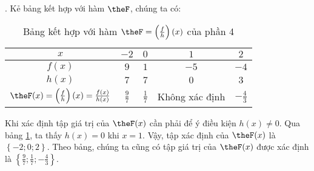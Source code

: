 . Kẻ bảng kết hợp với hàm $\theF$, chúng ta có:

\begin{table}[H]
   \centering
   \begin{tabular}{|c|c|c|c|c|}
      \hline
      $x$ & $-2$ & $0$ & $1$ & $2$ \\
      \hline
      $f(x)$ & $9$ & $1$ & $-5$ & $-4$ \\
      \hline
      $h(x)$ & $7$ & $7$ & $0$ & $3$ \\
      \hline
      $\theF(x) = \left(\frac{f}{h}\right)(x) = \frac{f(x)}{h(x)}$ & $\frac{9}{7}$ & $\frac{1}{7}$ & Không xác định & $-\frac{4}{3}$ \\
      \hline
   \end{tabular}
   \caption{Bảng kết hợp với hàm $\theF = \left(\frac{f}{h}\right)(x)$ của phần 4}
   \label{tab:ham_so_mot_bien:phep_tinh_ham:theF_4}
\end{table}

Khi xác định tập giá trị của $\theF(x)$ cần phải để ý điều kiện $h(x) \neq 0$. Qua bảng \ref{tab:ham_so_mot_bien:phep_tinh_ham:theF_4}, ta thấy $h(x) = 0$ khi $x=1$. Vậy, tập xác định của $\theF(x)$ là $\left\{-2; 0; 2\right\}$. Theo bảng, chúng ta cũng có tập giá trị của $\theF(x)$ được xác định là $\left\{\frac{9}{7}; \frac{1}{7}; -\frac{4}{3}\right\}$.